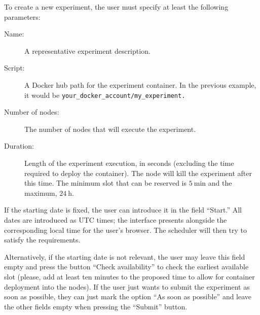 \documentclass[a4paper,10pt]{article}
\newcommand{\identifier}[1]{{\texttt{\small{#1}}}}
\begin{document}
To create a new experiment, the user must specify at least the following parameters:
\begin{description}
	\item [Name:] A representative experiment description.
	\item [Script:] A Docker hub path for the experiment container. In the previous example, it would be \identifier{your\_\allowbreak docker\_\allowbreak account/my\_\allowbreak experiment.}
	\item [Number of nodes:] The number of nodes that will execute the experiment.
	\item [Duration:] Length of the experiment execution, in seconds (excluding the time required to deploy the container).
	The node will kill the experiment after this time. The minimum slot that can be reserved is $\SI{5}{\minute}$ and the maximum, $\SI{24}{\hour}$.
\end{description}

If the starting date is fixed, the user can introduce it in the field ``Start.''
All dates are introduced as UTC times; the interface presents alongside the corresponding local time for the user's browser.
The scheduler will then try to satisfy the requirements.

Alternatively, if the starting date is not relevant, the user may leave this field empty and press the button ``Check availability'' to check the earliest available slot (please, add at least ten minutes to the proposed time to allow for container deployment into the nodes).
If the user just wants to submit the experiment as soon as possible, they can just mark the option ``As soon as possible'' and leave the other fields empty when pressing the ``Submit'' button.
\end{document}
